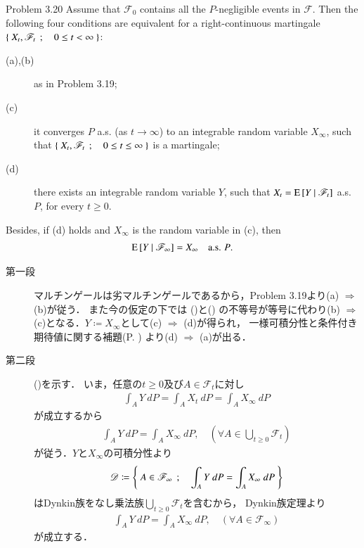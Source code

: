 	\begin{itembox}[l]{Problem 3.20}
		Assume that $\mathscr{F}_0$ contains all the $P$-negligible events in $\mathscr{F}$.
		Then the following four conditions are equivalent for a right-continuous martingale
		$\left\{\ X_t,\mathscr{F}_t\ \, ; \quad 0 \leq t < \infty\ \right\}$:
		\begin{description}
			\item[(a),(b)] as in Problem 3.19;
			\item[(c)] it converges $P$ a.s. (as $t \to \infty$) to an integrable random variable $X_\infty$,
				such that $\left\{\ X_t,\mathscr{F}_t\ \, ; \quad 0 \leq t \leq \infty\ \right\}$ is a martingale;
			\item[(d)] there exists an integrable random variable $Y$, such that $X_t = \operatorname{E} \left[ Y \ \middle|\ \mathscr{F}_t \right]$ a.s. $P$,
				for every $t \geq 0$.
		\end{description}
		Besides, if (d) holds and $X_\infty$ is the random variable in (c), then
		\begin{align}
			\operatorname{E} \left[ Y \ \middle|\ \mathscr{F}_\infty \right] = X_\infty
			\quad \mbox{a.s. $P$}.
			\label{eq:chapter_1_Problem_3_20_1}
		\end{align}
	\end{itembox}
	
	\begin{prf}\mbox{}
		\begin{description}
			\item[第一段] マルチンゲールは劣マルチンゲールであるから，Problem 3.19より(a) $\Rightarrow$ (b)が従う．
				また今の仮定の下では
				()と()
				の不等号が等号に代わり(b) $\Rightarrow$ (c)となる．$Y \coloneqq X_\infty$として(c) $\Rightarrow$ (d)が得られ，
				一様可積分性と条件付き期待値に関する補題(P. \pageref{lem:uniformly_integrability_and_conditional_expectations})
				より(d) $\Rightarrow$ (a)が出る．
				
			\item[第二段]
				()を示す．
				いま，任意の$t \geq 0$及び$A \in \mathscr{F}_t$に対し
				\begin{align}
					\int_A Y\ dP = \int_A X_t\ dP = \int_A X_\infty\ dP
				\end{align}
				が成立するから
				\begin{align}
					\int_A Y\ dP = \int_A X_\infty\ dP,
					\quad (\forall A \in \bigcup_{t \geq 0} \mathscr{F}_t)
				\end{align}
				が従う．$Y$と$X_\infty$の可積分性より
				\begin{align}
					\mathscr{D} \coloneqq
					\left\{\ A \in \mathscr{F}_\infty\ \, ; \quad \int_A Y\ dP = \int_A X_\infty\ dP\ \right\}
				\end{align}
				はDynkin族をなし乗法族$\bigcup_{t \geq 0} \mathscr{F}_t$を含むから，
				Dynkin族定理より
				\begin{align}
					\int_A Y\ dP = \int_A X_\infty\ dP,
					\quad (\forall A \in \mathscr{F}_\infty)
				\end{align}
				が成立する．
				\QED
		\end{description}
	\end{prf}